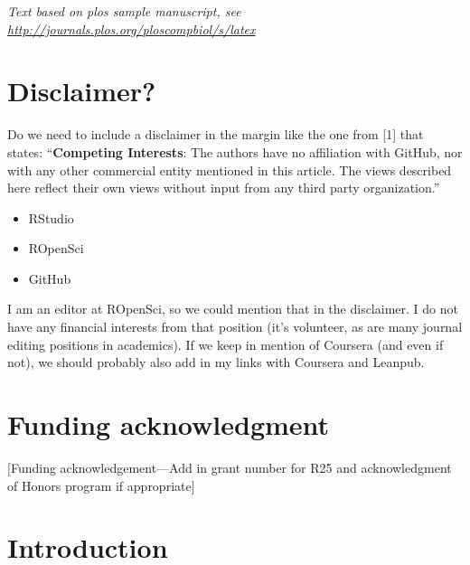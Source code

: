 \documentclass[10pt,letterpaper]{article}
\providecommand{\tightlist}{%
  \setlength{\itemsep}{0pt}\setlength{\parskip}{0pt}}
\begin{document}
\linenumbers

\emph{Text based on plos sample manuscript, see
\url{http://journals.plos.org/ploscompbiol/s/latex}}

\hypertarget{disclaimer}{%
\section{Disclaimer?}\label{disclaimer}}

Do we need to include a disclaimer in the margin like the one from
{[}1{]} that states: ``\textbf{Competing Interests}: The authors have no
affiliation with GitHub, nor with any other commercial entity mentioned
in this article. The views described here reflect their own views
without input from any third party organization.''

\begin{itemize}
\tightlist
\item
  RStudio
\item
  ROpenSci
\item
  GitHub
\end{itemize}

I am an editor at ROpenSci, so we could mention that in the disclaimer.
I do not have any financial interests from that position (it's
volunteer, as are many journal editing positions in academics). If we
keep in mention of Coursera (and even if not), we should probably also
add in my links with Coursera and Leanpub.

\hypertarget{funding-acknowledgment}{%
\section{Funding acknowledgment}\label{funding-acknowledgment}}

{[}Funding acknowledgement---Add in grant number for R25 and
acknowledgment of Honors program if appropriate{]}

\hypertarget{introduction}{%
\section{Introduction}\label{introduction}}
\end{document}
